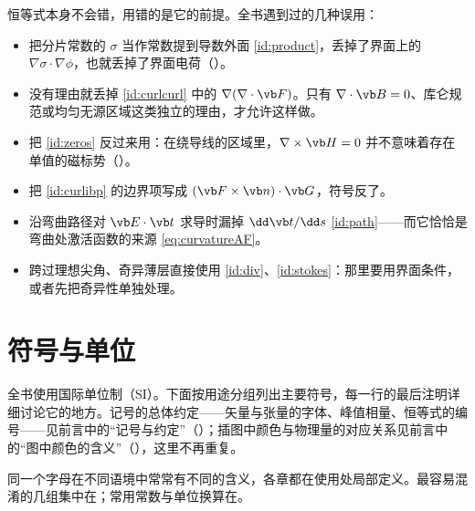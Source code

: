 \begin{pitfall}
恒等式本身不会错，用错的是它的前提。全书遇到过的几种误用：
\begin{itemize}
\item 把分片常数的 $\sigma$ 当作常数提到导数外面 \eqref{id:product}，丢掉了界面上的 $\nabla\sigma\cdot\nabla\phi$，也就丢掉了界面电荷（）。
\item 没有理由就丢掉 \eqref{id:curlcurl} 中的 $\nabla(\nabla\cdot\vb F)$。只有 $\nabla\cdot\vb B=0$、库仑规范或均匀无源区域这类独立的理由，才允许这样做。
\item 把 \eqref{id:zeros} 反过来用：在绕导线的区域里，$\nabla\times\vb H=0$ 并不意味着存在单值的磁标势（）。
\item 把 \eqref{id:curlibp} 的边界项写成 $(\vb F\times\vb n)\cdot\vb G$，符号反了。
\item 沿弯曲路径对 $\vb E\cdot\vb t$ 求导时漏掉 $\dd\vb t/\dd s$ \eqref{id:path}——而它恰恰是弯曲处激活函数的来源 \eqref{eq:curvatureAF}。
\item 跨过理想尖角、奇异薄层直接使用 \eqref{id:div}、\eqref{id:stokes}：那里要用界面条件，或者先把奇异性单独处理。
\end{itemize}
\end{pitfall}

\chapter{符号与单位}\label{app:symbols}

全书使用国际单位制（SI）。下面按用途分组列出主要符号，每一行的最后注明详细讨论它的地方。记号的总体约定——矢量与张量的字体、峰值相量、恒等式的编号——见前言中的“记号与约定”（）；插图中颜色与物理量的对应关系见前言中的“图中颜色的含义”（），这里不再重复。

同一个字母在不同语境中常常有不同的含义，各章都在使用处局部定义。最容易混淆的几组集中在；常用常数与单位换算在。

\newcommand{\symhead}{\toprule 符号 & 单位 & 名称 & 含义与出处\\\midrule}
\newcommand{\symtable}[1]{\begingroup\small\renewcommand{\arraystretch}{1.18}%
\begin{longtable}{@{}>{\raggedright\arraybackslash}p{.15\linewidth} >{\raggedright\arraybackslash}p{.15\linewidth} >{\raggedright\arraybackslash}p{.18\linewidth} >{\raggedright\arraybackslash}p{.43\linewidth}@{}}
\symhead\endfirsthead
\symhead\endhead
#1
\bottomrule
\end{longtable}\endgroup}

